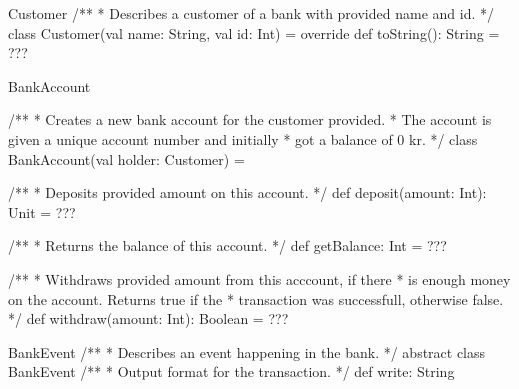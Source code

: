 \begin{ScalaSpec}{Customer}
/**
 * Describes a customer of a bank with provided name and id.
 */
class Customer(val name: String, val id: Int) = {
	override def toString(): String = ???
}

\end{ScalaSpec}


\begin{ScalaSpec}{BankAccount}

/**
 * Creates a new bank account for the customer provided.
 * The account is given a unique account number and initially
 * got a balance of 0 kr.
 */
class BankAccount(val holder: Customer) = {

 /**
   * Deposits provided amount on this account.
   */
  def deposit(amount: Int): Unit = ???

/**
   * Returns the balance of this account.
   */
  def getBalance: Int = ???

/**
   * Withdraws provided amount from this acccount, if there
   * is enough money on the account. Returns true if the 
   * transaction was successfull, otherwise false. 
   */
  def withdraw(amount: Int): Boolean = ???

}
\end{ScalaSpec}


\begin{ScalaSpec}{BankEvent}
/**
 * Describes an event happening in the bank.
 */
abstract class BankEvent {   
  /**
   * Output format for the transaction.
   */
  def write: String
}

\end{ScalaSpec}


